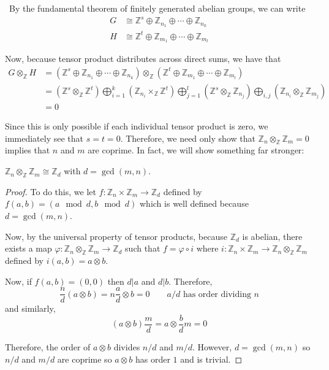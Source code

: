 \documentclass[12pt]{Qual}
\begin{document}
\begin{solution}$\,$
By the fundamental theorem of finitely generated abelian groups, we can write \begin{align*}
    G&\cong\mathbb{Z}^s\oplus\mathbb{Z}_{n_1}\oplus\cdots\oplus\mathbb{Z}_{n_k}\\
    H&\cong\mathbb{Z}^t\oplus\mathbb{Z}_{m_1}\oplus\cdots\oplus\mathbb{Z}_{m_l}
\end{align*}

Now, because tensor product distributes across direct sums, we have that \begin{align*}
    G\otimes_\mathbb{Z}H&=(\mathbb{Z}^s\oplus\mathbb{Z}_{n_1}\oplus\cdots\oplus\mathbb{Z}_{n_k})\otimes_\mathbb{Z}(\mathbb{Z}^t\oplus\mathbb{Z}_{m_1}\oplus\cdots\oplus\mathbb{Z}_{m_l})\\
    &=(\mathbb{Z}^s\otimes_\mathbb{Z}\mathbb{Z}^t)\bigoplus_{i=1}^k(\mathbb{Z}_{n_i}\times_{\mathbb{Z}}\mathbb{Z}^t)\bigoplus_{j=1}^l(\mathbb{Z}^s\otimes_\mathbb{Z}\mathbb{Z}_{n_j})\bigoplus_{i,j}(\mathbb{Z}_{n_i}\otimes_\mathbb{Z}\mathbb{Z}_{m_j})\\
    &=0
\end{align*}

Since this is only possible if each individual tensor product is zero, we immediately see that $s=t=0$. Therefore, we need only show that $\mathbb{Z}_n\otimes_\mathbb{Z}\mathbb{Z}_m=0$ implies that $n$ and $m$ are coprime. In fact, we will show something far stronger:

\begin{claim} $\mathbb{Z}_n\otimes_\mathbb{Z}\mathbb{Z}_m\cong\mathbb{Z}_d$ with $d=\gcd(m,n)$.
\begin{proof} To do this, we let $f:\mathbb{Z}_n\times\mathbb{Z}_m\to\mathbb{Z}_d$ defined by $f(a,b)=(a\mod d,b\mod d)$ which is well defined because $d=\gcd(m,n)$.

Now, by the universal property of tensor products, because $\mathbb{Z}_d$ is abelian, there exists a map $\varphi:\mathbb{Z}_n\otimes_\mathbb{Z}\mathbb{Z}_m\to\mathbb{Z}_d$ such that $f=\varphi\circ i$ where $i:\mathbb{Z}_n\times\mathbb{Z}_m\to \mathbb{Z}_n\otimes_\mathbb{Z}\mathbb{Z}_m$ defined by $i(a,b)=a\otimes b$.

Now, if $f(a,b)=(0,0)$ then $d|a$ and $d|b$. Therefore, $$\frac{n}{d}(a\otimes b)=n\frac{a}{d}\otimes b=0\qquad a/d\text{ has order dividing }n$$ and similarly, $$(a\otimes b)\frac{m}{d}=a\otimes \frac{b}{d}m=0$$

Therefore, the order of $a\otimes b$ divides $n/d$ and $m/d$. However, $d=\gcd(m,n)$ so $n/d$ and $m/d$ are coprime so $a\otimes b$ has order $1$ and is trivial.


\end{proof}
\end{claim}
\end{solution}
\end{document}
